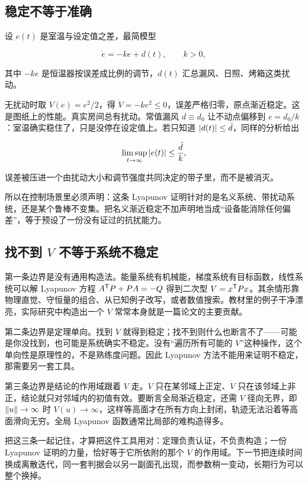 \subsection{稳定不等于准确}

设 \(e(t)\) 是室温与设定值之差，最简模型

\[
\dot e=-ke+d(t),
\qquad k>0,
\]

其中 \(-ke\) 是恒温器按误差成比例的调节，\(d(t)\) 汇总漏风、日照、烤箱这类扰动。

无扰动时取 \(V(e)=e^2/2\)，得 \(\dot V=-ke^2\le0\)，误差严格归零，原点渐近稳定。这是图纸上的性能。真实房间总有扰动。常值漏风 \(d\equiv d_0\) 让不动点偏移到 \(e=d_0/k\)：室温确实稳住了，只是没停在设定值上。若只知道 \(\left|d(t)\right|\le\bar d\)，同样的分析给出

\[
\limsup_{t\to\infty}\left|e(t)\right|\le\frac{\bar d}{k},
\]

误差被压进一个由扰动大小和调节强度共同决定的带子里，而不是被消灭。

所以在控制场景里必须声明：这条 Lyapunov 证明针对的是名义系统、带扰动系统，还是某个鲁棒不变集。把名义渐近稳定不加声明地当成``设备能消除任何偏差''，等于预设了一份没有证过的抗扰能力。

\subsection{找不到 \(V\) 不等于系统不稳定}

第一条边界是没有通用构造法。能量系统有机械能，梯度系统有目标函数，线性系统可以解 Lyapunov 方程 \(A^{\mathsf{T}}P+PA=-Q\) 得到二次型 \(V=x^{\mathsf{T}}Px\)。其余情形靠物理直觉、守恒量的组合、从已知例子改写，或者数值搜索。教材里的例子干净漂亮，实际研究中构造出一个 \(V\) 常常本身就是一篇论文的主要贡献。

第二条边界是定理单向。找到 \(V\) 就得到稳定；找不到则什么也断言不了——可能是你没找到，也可能是系统确实不稳定。没有``遍历所有可能的 \(V\)''这种操作，这个单向性是原理性的，不是熟练度问题。因此 Lyapunov 方法不能用来证明不稳定，那需要另一套工具。

第三条边界是结论的作用域跟着 \(V\) 走。\(V\) 只在某邻域上正定、\(\dot V\) 只在该邻域上非正，结论就只对邻域内的初值有效。要断言全局渐近稳定，还需 \(V\) 径向无界，即 \(\left\lVert u\right\rVert\to\infty\) 时 \(V(u)\to\infty\)，这样等高面才在所有方向上封闭，轨迹无法沿着等高面滑向无穷。全局 Lyapunov 函数通常比局部的难构造得多。

把这三条一起记住，才算把这件工具用对：定理负责认证，不负责构造；一份 Lyapunov 证明的力量，恰好等于它所依附的那个 \(V\) 的作用域。下一节把连续时间换成离散迭代，同一套判据会以另一副面孔出现，而参数稍一变动，长期行为可以整个换掉。
